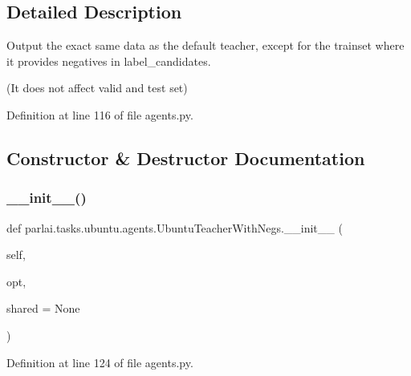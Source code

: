 \subsection{Detailed Description}
\begin{DoxyVerb}Output the exact same data as the default teacher, except for the trainset where it
provides negatives in label_candidates.

(It does not affect valid and test set)
\end{DoxyVerb}
 

Definition at line 116 of file agents.\+py.



\subsection{Constructor \& Destructor Documentation}
\mbox{\label{classparlai_1_1tasks_1_1ubuntu_1_1agents_1_1UbuntuTeacherWithNegs_a10a49844810d11e7aecf4b7854c81787}} 
\subsubsection{\texorpdfstring{\+\_\+\+\_\+init\+\_\+\+\_\+()}{\_\_init\_\_()}}
{\footnotesize\ttfamily def parlai.\+tasks.\+ubuntu.\+agents.\+Ubuntu\+Teacher\+With\+Negs.\+\_\+\+\_\+init\+\_\+\+\_\+ (\begin{DoxyParamCaption}\item[{}]{self,  }\item[{}]{opt,  }\item[{}]{shared = {\ttfamily None} }\end{DoxyParamCaption})}



Definition at line 124 of file agents.\+py.



